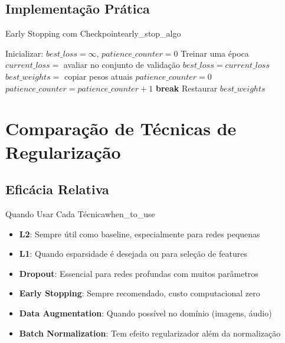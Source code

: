 \documentclass[a4paper,12pt]{article}
\begin{document}
\subsection{Implementação Prática}

\begin{algoritmo}{Early Stopping com Checkpoint}{early_stop_algo}
\begin{algorithm}[H]
\caption{Early Stopping com Restauração de Melhor Modelo}
\begin{algorithmic}[1]
\STATE Inicializar: $best\_loss = \infty$, $patience\_counter = 0$
    \STATE Treinar uma época
    \STATE $current\_loss = $ avaliar no conjunto de validação
        \STATE $best\_loss = current\_loss$
        \STATE $best\_weights = $ copiar pesos atuais
        \STATE $patience\_counter = 0$
    \ELSE
        \STATE $patience\_counter = patience\_counter + 1$
    \ENDIF
        \STATE \textbf{break}
    \ENDIF
\ENDFOR
\STATE Restaurar $best\_weights$
\end{algorithmic}
\end{algorithm}
\end{algoritmo}

\section{Comparação de Técnicas de Regularização}

\subsection{Eficácia Relativa}

\begin{observacao}{Quando Usar Cada Técnica}{when_to_use}
\begin{itemize}
    \item \textbf{L2}: Sempre útil como baseline, especialmente para redes pequenas
    \item \textbf{L1}: Quando esparsidade é desejada ou para seleção de features
    \item \textbf{Dropout}: Essencial para redes profundas com muitos parâmetros
    \item \textbf{Early Stopping}: Sempre recomendado, custo computacional zero
    \item \textbf{Data Augmentation}: Quando possível no domínio (imagens, áudio)
    \item \textbf{Batch Normalization}: Tem efeito regularizador além da normalização
\end{itemize}
\end{observacao}
\end{document}
